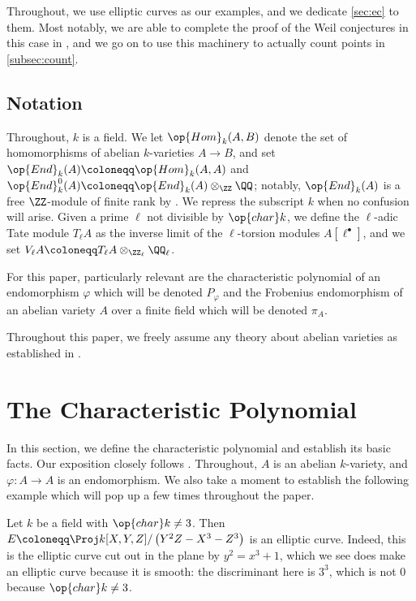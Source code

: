 \documentclass{amsart}
\begin{document}
Throughout, we use elliptic curves as our examples, and we dedicate \cref{sec:ec} to them. Most notably, we are able to complete the proof of the Weil conjectures in this case in , and we go on to use this machinery to actually count points in \cref{subsec:count}.

\subsection{Notation}
Throughout, $k$ is a field. We let $\op{Hom}_k(A,B)$ denote the set of homomorphisms of abelian $k$-varieties $A\to B$, and set $\op{End}_k(A)\coloneqq\op{Hom}_k(A,A)$ and $\op{End}^0_k(A)\coloneqq\op{End}_k(A)\otimes_\ZZ\QQ$; notably, $\op{End}_k(A)$ is a free $\ZZ$-module of finite rank by \cite[Corollary~3.6]{elber-av}. We repress the subscript $k$ when no confusion will arise. Given a prime $\ell$ not divisible by $\op{char}k$, we define the $\ell$-adic Tate module $T_\ell A$ as the inverse limit of the $\ell$-torsion modules $A\left[\ell^\bullet\right]$, and we set $V_\ell A\coloneqq T_\ell A\otimes_{\ZZ_\ell}\QQ_\ell$.

For this paper, particularly relevant are the characteristic polynomial of an endomorphism $\varphi$ which will be denoted $P_\varphi$ and the Frobenius endomorphism of an abelian variety $A$ over a finite field which will be denoted $\pi_A$.
\begin{remark}
	Throughout this paper, we freely assume any theory about abelian varieties as established in \cite{elber-av}.
\end{remark}

\section{The Characteristic Polynomial} \label{sec:char-poly}
In this section, we define the characteristic polynomial and establish its basic facts. Our exposition closely follows \cite[Section~I.10]{milne-av}. Throughout, $A$ is an abelian $k$-variety, and $\varphi\colon A\to A$ is an endomorphism. We also take a moment to establish the following example \cite[Example~2.1]{elber-av} which will pop up a few times throughout the paper.
\begin{example} \label{ex:ec}
	Let $k$ be a field with $\op{char}k\ne3$. Then $E\coloneqq\Proj k[X,Y,Z]/\left(Y^2Z-X^3-Z^3\right)$ is an elliptic curve. Indeed, this is the elliptic curve cut out in the plane by $y^2=x^3+1$, which we see does make an elliptic curve because it is smooth: the discriminant here is $3^3$, which is not $0$ because $\op{char}k\ne3$.
\end{example}
\end{document}
